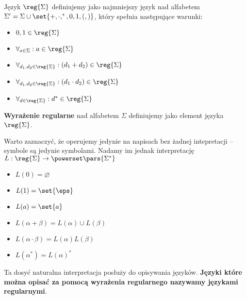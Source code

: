 \begin{definition}
    Język \( \reg{\Sigma} \) definiujemy jako najmniejszy język nad alfabetem \( \Sigma' = \Sigma \cup \set{+, \cdot, ^*, 0, 1, (, )} \), który spełnia następujące warunki:
    
       \begin{itemize}
        \item \( 0, 1 \in \reg{\Sigma} \)
        \item \( \forall_{a \in \Sigma}: a \in \reg{\Sigma} \)
        \item \( \forall_{d_1, d_2 \in \reg{\Sigma}}: (d_1 + d_2) \in \reg{\Sigma} \)
        \item \( \forall_{d_1, d_2 \in \reg{\Sigma}}: (d_1 \cdot d_2) \in \reg{\Sigma} \)
        \item \( \forall_{d \in \reg{\Sigma}}: d^* \in \reg{\Sigma} \)
    \end{itemize}
\end{definition}

\begin{definition}
    \textbf{Wyrażenie regularne} nad alfabetem \( \Sigma \) definiujemy jako element języka  \( \reg{\Sigma} \).
    
\end{definition}

Warto zaznaczyć, że operujemy jedynie na napisach bez żadnej intepretacji -- symbole są jedynie symbolami.
Nadamy im jednak interpretację \( L: \reg{\Sigma} \rightarrow \powerset\pars{\Sigma^*} \)
\begin{itemize}
    \item \( L(0) = \varnothing \)
    \item \( L(1) = \set{\eps} \)
    \item \( L(a) = \set{a} \)
    \item \( L(\alpha + \beta) = L(\alpha) \cup L(\beta) \)
    \item \( L(\alpha \cdot \beta) = L(\alpha)L(\beta) \)
    \item \( L(\alpha^*) = L(\alpha)^* \)
\end{itemize}

Ta dosyć naturalna interpretacja posłuży do opisywania języków. \textbf{Języki które można opisać za pomocą wyrażenia regularnego nazywamy językami regularnymi}.